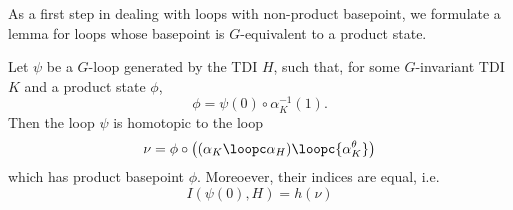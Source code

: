 As a first step in dealing with loops with non-product basepoint, we formulate a lemma for loops whose basepoint is $G$-equivalent to a product state. 
\begin{lemma}\label{lem: loops with prod equiv}
	Let $\psi$ be a $G$-loop generated by the TDI $H$, such that, for some  $G$-invariant TDI $K$ and a product state $\phi$, 
	$$\phi=\psi(0)\circ \alpha^{-1}_K(1).$$ 
	Then the loop $\psi$ is homotopic to the loop 
	\begin{equation} \label{eq: def loop three parts}
		\nu=\phi \circ \left(({\alpha_{K}} \loopc \alpha_{H}) \loopc  {\alpha^\theta_{K}}\right)
	\end{equation}
	which has product basepoint $\phi$. Moreoever, their indices are equal, i.e.\
	\begin{equation} \label{eq: equality index inter}
		I(\psi(0),H)=h(\nu)
	\end{equation} 
\end{lemma}

